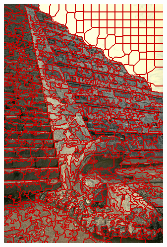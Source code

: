 \begin{figure}
{		\includegraphics[scale=\scalefivebsdtest]{pictures/bsd-test-6-oriseedsmp}
	}
	\subfigure{
}
\end{figure}
